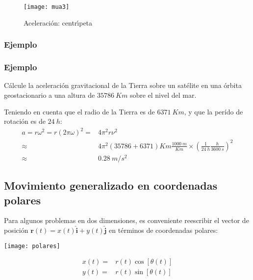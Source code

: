 \begin{frame}
  \begin{figure}
    \centering
    \texttt{[image: mua3]}
    \caption{Aceleraci\'on: centr\'\i peta}
    \label{fig:mua3}
  \end{figure}


\end{frame}

\subsubsection*{Ejemplo}

\subsubsection*{Ejemplo}
Cálcule la aceleración gravitacional de la Tierra sobre un satélite en una órbita geostacionario a una altura de $\SI{35786}{Km}$ sobre el nivel del mar. 

Teniendo en cuenta que el radio de la Tierra es de $\SI{6371}{Km}$, y que la perído de rotación es de $\SI{24}{h}$:
\begin{align*}
  a=r \omega^2=r \left( 2\pi\omega \right)^2=&4\pi^2 r \nu^2 \nonumber\\
              \approx&4\pi^2 (\num{35786}+\num{6371})\si{Km} \frac{\SI{1000}{m}}{\si{Km}}\times \left(  \frac{1}{\SI{24}{h}}\frac{\si{h}}{\SI{3600}{s}}\right)^2 \nonumber\\
              \approx&\SI{0.28}{m/s^2}
\end{align*}


\subsection{Movimiento generalizado en coordenadas polares}


Para algunos problemas en dos dimensiones, es conveniente reescribir el vector de posición $\mathbf{r}(t)=x(t)\hat{\mathbf{i}}+y(t)\hat{\mathbf{j}}$ en términos de coordenadas polares:

\begin{frame}
\noindent
\begin{minipage}{0.2\textwidth}
\texttt{[image: polares]}  
\end{minipage}
\begin{minipage}{0.8\textwidth}
  \begin{align}
    \label{eq:polares}
    x(t)=&r(t)\cos \left[ \theta(t) \right]\nonumber\\
    y(t)=&r(t)\sin \left[ \theta(t) \right]
  \end{align}
\end{minipage}
\end{frame}


